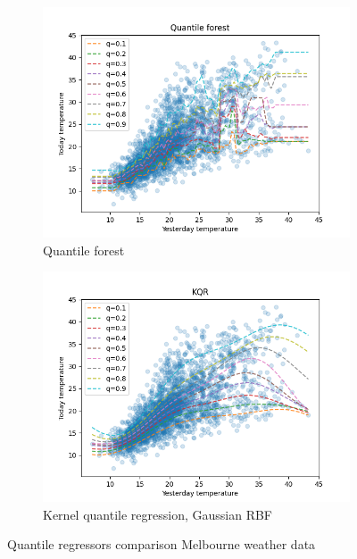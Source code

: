\begin{figure}[!h]
\begin{subfigure}[b]{0.5\linewidth}
      \vspace{4ex}
    \end{subfigure} 
    \begin{subfigure}[b]{0.5\linewidth}
      \centering
      \includegraphics[width=1.1\textwidth]{images/melbourne_quantile_forest.png} 
      \caption{Quantile forest} 
      \label{fig:melbourne_quantile_forest} 
    \end{subfigure}%
    \begin{subfigure}[b]{0.5\linewidth}
      \centering
      \includegraphics[width=1.1\textwidth]{images/melbourne_kernel_quantile_regression.png}
      \caption{Kernel quantile regression, Gaussian RBF} 
      \label{fig:melborune_kernel_quantile_regression} 
    \end{subfigure} 
    \caption{Quantile regressors comparison Melbourne weather data}
    \label{fig:melbourne_quantiles_comparison} 
  \end{figure}

